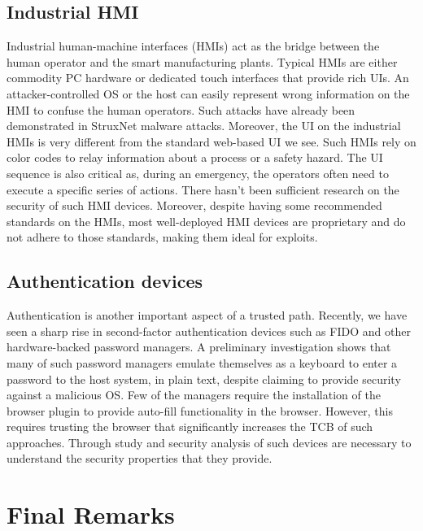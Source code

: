 \subsection{Industrial HMI} Industrial human-machine interfaces (HMIs) act as the bridge between the human operator and the smart manufacturing plants. Typical HMIs are either commodity PC hardware or dedicated touch interfaces that provide rich UIs. An attacker-controlled OS or the host can easily represent wrong information on the HMI to confuse the human operators. Such attacks have already been demonstrated in StruxNet malware attacks. Moreover, the UI on the industrial HMIs is very different from the standard web-based UI we see. Such HMIs rely on color codes to relay information about a process or a safety hazard. The UI sequence is also critical as, during an emergency, the operators often need to execute a specific series of actions. There hasn't been sufficient research on the security of such HMI devices. Moreover, despite having some recommended standards on the HMIs, most well-deployed HMI devices are proprietary and do not adhere to those standards, making them ideal for exploits. 


\subsection{Authentication devices} Authentication is another important aspect of a trusted path. Recently, we have seen a sharp rise in second-factor authentication devices such as FIDO and other hardware-backed password managers. A preliminary investigation shows that many of such password managers emulate themselves as a keyboard to enter a password to the host system, in plain text, despite claiming to provide security against a malicious OS. Few of the managers require the installation of the browser plugin to provide auto-fill functionality in the browser. However, this requires trusting the browser that significantly increases the TCB of such approaches. Through study and security analysis of such devices are necessary to understand the security properties that they provide.



\section{Final Remarks}

